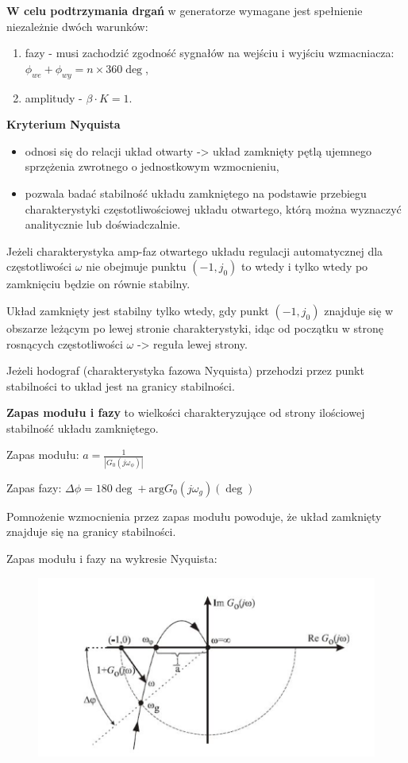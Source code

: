 \textbf{W celu podtrzymania drgań} w generatorze wymagane jest spełnienie niezależnie dwóch warunków:
\begin{enumerate}
    \item fazy - musi zachodzić zgodność sygnałów na wejściu i wyjściu wzmacniacza: $\phi_{we}+\phi_{wy} = n\times{}360\deg$,
    \item amplitudy - $\beta{}\cdot{}K=1$.
\end{enumerate}

\textbf{Kryterium Nyquista}
\begin{itemize}
    \item odnosi się do relacji układ otwarty -> układ zamknięty pętlą ujemnego sprzężenia zwrotnego o jednostkowym wzmocnieniu,
    \item pozwala badać stabilność układu zamkniętego na podstawie przebiegu charakterystyki częstotliwościowej układu otwartego, którą można wyznaczyć analitycznie lub doświadczalnie.
\end{itemize}

Jeżeli charakterystyka amp-faz otwartego układu regulacji automatycznej dla częstotliwości $\omega$ nie obejmuje punktu $(-1,j_0)$ to wtedy i tylko wtedy po zamknięciu będzie on równie stabilny.

Układ zamknięty jest stabilny tylko wtedy, gdy punkt $(-1,j_0)$ znajduje się w obszarze leżącym po lewej stronie charakterystyki, idąc od początku w stronę rosnących częstotliwości $\omega$ -> reguła lewej strony.

Jeżeli hodograf (charakterystyka fazowa Nyquista) przehodzi przez punkt stabilności to układ jest na granicy stabilności.

\textbf{Zapas modułu i fazy} to wielkości charakteryzujące od strony ilościowej stabilność układu zamkniętego.

Zapas modułu: $a = \frac{1}{\left|G_0(j\omega_\phi)\right|}$

Zapas fazy: $\Delta\phi = 180\deg + \mathrm{arg}G_0(j\omega_g)(\deg)$

Pomnożenie wzmocnienia przez zapas modułu powoduje, że układ zamknięty znajduje się na granicy stabilności.

\clearpage
Zapas modułu i fazy na wykresie Nyquista:
\begin{figure}[!h]
\centering
\includegraphics[width=0.7\linewidth]{fig/Zapasy amp i fazy.png}
\end{figure}

